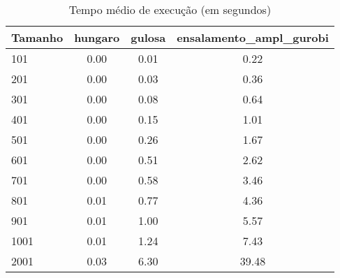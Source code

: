 \begin{table}[htbp]
\centering
\caption{Tempo médio de execução (em segundos)}
\label{tab:tempo_execucao_heuristicas}
\begin{tabular}{lccc}
\toprule
Tamanho & hungaro & gulosa & ensalamento_ampl_gurobi \\
\midrule
101 & 0.00 & 0.01 & 0.22 \\
201 & 0.00 & 0.03 & 0.36 \\
301 & 0.00 & 0.08 & 0.64 \\
401 & 0.00 & 0.15 & 1.01 \\
501 & 0.00 & 0.26 & 1.67 \\
601 & 0.00 & 0.51 & 2.62 \\
701 & 0.00 & 0.58 & 3.46 \\
801 & 0.01 & 0.77 & 4.36 \\
901 & 0.01 & 1.00 & 5.57 \\
1001 & 0.01 & 1.24 & 7.43 \\
2001 & 0.03 & 6.30 & 39.48 \\
\bottomrule
\end{tabular}
\end{table}
